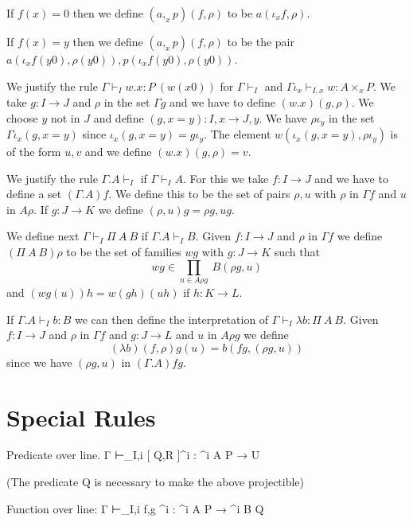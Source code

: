 \documentclass[10pt,a4paper]{article}
\newcommand\CSig[1]{\Sigma^{#1}}
\newcommand\linefun[3]{\langle #2,#3 \rangle^{#1}}
\newcommand\linepred[3]{[ #2,#3 ]^{#1}}
\newcommand{\Prod}[2]{\displaystyle\prod _{#1}~#2}
\begin{document}
 If $f(x) = 0$ then we define $(a,_xp)(f,\rho)$ to be $a(\iota_xf,\rho)$.

 If $f(x) = y$ then we define $(a,_x p)(f,\rho)$ to be the pair $a(\iota_xf(y0),\rho(y0)),p(\iota_xf(y0),\rho(y0))$.

\medskip

 We justify the rule $\Gamma\vdash_I w.x:P~(w(x0))$ for $\Gamma\vdash_I$
and $\Gamma\iota_x\vdash_{I,x} w:A\times_x P$. We take $g:I\rightarrow J$ and
$\rho$ in the set $\Gamma g$ and we have to define $(w.x)(g,\rho)$.
We choose $y$ not in $J$ and define $(g,x=y):I,x\rightarrow J,y$.
We have $\rho\iota_y$ in the set $\Gamma\iota_x (g,x=y)$ since
$\iota_x (g,x=y) = g\iota_y$. The element $w(\iota_x (g,x=y),\rho\iota_y)$ is of the form
$u,v$ and we define $(w.x)(g,\rho) = v$.

\medskip

 We justify the rule $\Gamma.A\vdash_I$ if $\Gamma\vdash_I A$. For this we take
$f:I\rightarrow J$ and we have to define a set $(\Gamma.A)f$. We define this to be
the set of pairs $\rho,u$ with $\rho$ in $\Gamma f$ and $u$ in $A\rho$.
If $g:J\rightarrow K$ we define $(\rho,u)g = \rho g,ug$.

 We define next $\Gamma\vdash_I \Pi~A~B$ if $\Gamma.A\vdash_I B$. Given $f:I\rightarrow J$
and $\rho$ in $\Gamma f$ we define $(\Pi~A~B)\rho$ to be the set of families
$wg$ with $g:J\rightarrow K$ such that
$$
wg\in \Prod{u\in A\rho g}{B(\rho g,u)}
$$
and $(wg(u))h = w(gh)(uh)$ if $h:K\rightarrow L$.

 If $\Gamma.A\vdash _I b:B$ we can then define the interpretation of
$\Gamma\vdash_I \lambda b:\Pi~A~B$. Given $f:I\rightarrow J$ and
$\rho$ in $\Gamma f$ and $g:J\rightarrow L$ and $u$ in $A\rho g$ we define 
$$
(\lambda b)(f,\rho) g(u) = b(fg,(\rho g,u))
$$
since we have $(\rho g,u)$ in $(\Gamma.A)fg$.

\section{Special Rules}



Predicate over line. 
          {Γ ⊢_{I,i} \linepred i Q R : \CSig i A P → U}

(The predicate Q is necessary to make the above projectible)

Function over line:
          {Γ ⊢_{I,i} \linefun i f g : \CSig i A P → \CSig i B Q }
\end{document}

